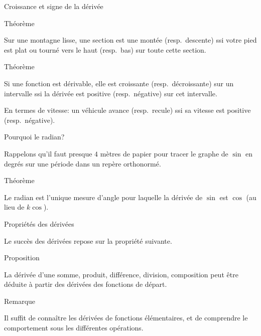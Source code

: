 \documentclass{beamer}
\begin{document}
\begin{frame}
    {Croissance et signe de la dérivée}

    \begin{exampleblock}
        {Théorème}

        Sur une montagne lisse, une section est une montée (resp.\ descente) ssi votre pied est plat ou tourné vers le haut (resp.\ bas) sur toute cette section.
    \end{exampleblock}
    \pause{}

    \begin{alertblock}
        {Théorème}

        Si une fonction est dérivable, elle est croissante (resp.\ décroissante) sur un intervalle ssi la dérivée est positive (resp.\ négative) sur cet intervalle.
    \end{alertblock}

    \pause{}
    En termes de vitesse: un véhicule avance (resp.\ recule) ssi sa vitesse est positive (resp.\ négative).
\end{frame}

\begin{frame}
    {Pourquoi le radian?}

    Rappelons qu'il faut presque $4$ mètres de papier pour tracer le graphe de $\sin$ en degrés sur une période dans un repère orthonormé.
    \pause{}

    \begin{exampleblock}
        {Théorème}

        Le radian est l'unique mesure d'angle pour laquelle la dérivée de $\sin$ est $\cos$ (au lieu de $k \cos$).
    \end{exampleblock}
\end{frame}

\begin{frame}
    {Propriétés des dérivées}

    Le succès des dérivées repose sur la propriété suivante.
    \begin{exampleblock}
        {Proposition}

        La dérivée d'une somme, produit, différence, division, composition peut être déduite à partir des dérivées des fonctions de départ.
    \end{exampleblock}
    \pause{}

    \begin{alertblock}
        {Remarque}

        Il suffit de connaître les dérivées de fonctions élémentaires,
        et de comprendre le comportement sous les différentes opérations.
    \end{alertblock}
\end{frame}
\end{document}
